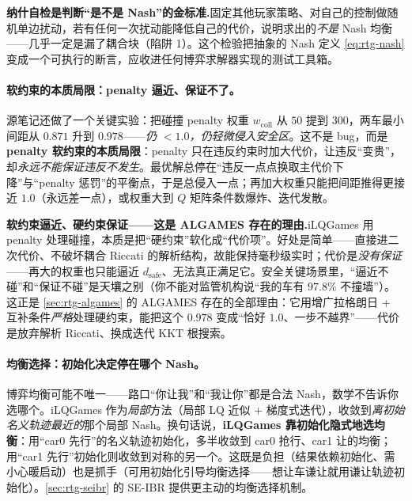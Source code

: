 \begin{insight}
\textbf{纳什自检是判断“是不是 Nash”的金标准.}\;固定其他玩家策略、对自己的控制做随机单边扰动，若有任何一次扰动能降低自己的代价，说明求出的\emph{不是} Nash 均衡——几乎一定是漏了耦合块（陷阱 1）。这个检验把抽象的 Nash 定义 \cref{eq:rtg-nash} 变成一个可执行的断言，应收进任何博弈求解器实现的测试工具箱。
\end{insight}

\paragraph{软约束的本质局限：penalty 逼近、保证不了。}
源笔记还做了一个关键实验：把碰撞 penalty 权重 $w_{\text{coll}}$ 从 $50$ 提到 $300$，两车最小间距从 $0.871$ 升到 $0.978$——\emph{仍 $<1.0$，仍轻微侵入安全区}\cite{fridovich2020efficient}。这不是 bug，而是 \textbf{penalty 软约束的本质局限}：penalty 只在违反约束时加大代价，让违反“变贵”，却\emph{永远不能保证违反不发生}。最优解总停在“违反一点点换取主代价下降”与“penalty 惩罚”的平衡点，于是总侵入一点；再加大权重只能把间距推得更接近 $1.0$（永远差一点），或权重大到 $Q$ 矩阵条件数爆炸、迭代发散。

\begin{insight}
\textbf{软约束逼近、硬约束保证——这是 ALGAMES 存在的理由.}\;iLQGames 用 penalty 处理碰撞，本质是把“硬约束”软化成“代价项”。好处是简单——直接进二次代价、不破坏耦合 Riccati 的解析结构，故能保持毫秒级实时；代价是\emph{没有保证}——再大的权重也只能逼近 $d_{\text{safe}}$、无法真正满足它。安全关键场景里，“逼近不碰”和“保证不碰”是天壤之别（你不能对监管机构说“我的车有 $97.8\%$ 不撞墙”）。这正是 \cref{sec:rtg-algames} 的 ALGAMES 存在的全部理由：它用增广拉格朗日 + 互补条件\emph{严格}处理硬约束，能把这个 $0.978$ 变成“恰好 $1.0$、一步不越界”——代价是放弃解析 Riccati、换成迭代 KKT 根搜索。
\end{insight}

\paragraph{均衡选择：初始化决定停在哪个 Nash。}
博弈均衡可能不唯一——路口“你让我”和“我让你”都是合法 Nash，数学不告诉你选哪个。iLQGames 作为\emph{局部}方法（局部 LQ 近似 + 梯度式迭代），收敛到\emph{离初始名义轨迹最近的}那个局部 Nash。换句话说，\textbf{iLQGames 靠初始化隐式地选均衡}：用“car0 先行”的名义轨迹初始化，多半收敛到 car0 抢行、car1 让的均衡；用“car1 先行”初始化则收敛到对称的另一个。这既是负担（结果依赖初始化、需小心暖启动）也是抓手（可用初始化引导均衡选择——想让车谦让就用谦让轨迹初始化）。\cref{sec:rtg-seibr} 的 SE-IBR 提供更主动的均衡选择机制。

